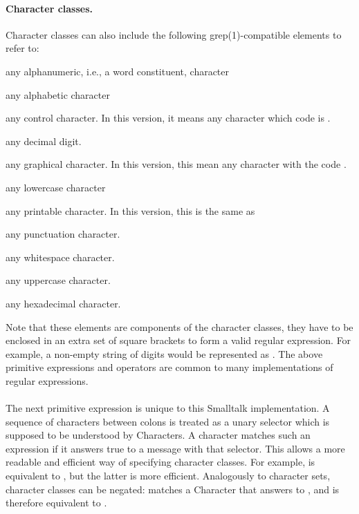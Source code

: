 \documentclass[a4paper,10pt,twoside]{book}
\begin{document}
{\paragraph{Character classes.}
Character classes can also include the following grep(1)-compatible elements to refer to: 
\begin{description}
\item \ct{[:alnum:]}	any alphanumeric, i.e., a word constituent, character 
\item	\ct{[:alpha:]}		any alphabetic character 
\item	\ct{[:cntrl:]}		any control character. In this version, it means any character which code is . \item \ct{[:digit:]}		any decimal digit. 	
\item \ct{[:graph:]}		any graphical character. In this version, this mean any character with the code . 	
\item \ct{[:lower:]}		any lowercase character 	
\item \ct{[:print:]}		any printable character. In this version, this is the same as \ct{[:cntrl:]}
\item \ct{[:punct:]}		any punctuation character. 
\item \ct{[:space:]}		any whitespace character. 	
\item \ct{[:upper:]}		any uppercase character. 	
\item \ct{[:xdigit:]}		any hexadecimal character.
\end{description}


Note that these elements are components of the character classes, \ie they have to be enclosed in an extra set of square brackets to form a valid regular expression.  For example, a non-empty string of digits would be represented as \ct{[[:digit:]]+}. The above primitive expressions and operators are common to many implementations of regular expressions. 

\paragraph{} The next primitive expression is unique to this Smalltalk implementation. A sequence of characters between colons is treated as a unary selector which is supposed to be understood by Characters. A character matches such an expression if it answers true to a message with that selector. This allows a more readable and efficient way of specifying character classes. For example, \ct{[0-9]} is equivalent to , but the latter is more efficient. Analogously to character sets, character classes can be negated:  matches a Character that answers  to , and is therefore equivalent to \ct{[^0-9]}. 

}
\end{document}

